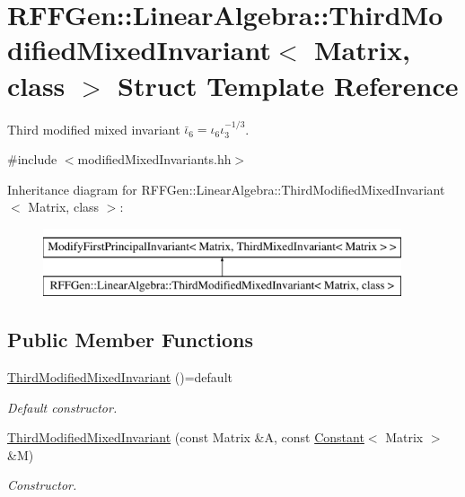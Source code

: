 \hypertarget{structRFFGen_1_1LinearAlgebra_1_1ThirdModifiedMixedInvariant}{\section{R\-F\-F\-Gen\-:\-:Linear\-Algebra\-:\-:Third\-Modified\-Mixed\-Invariant$<$ Matrix, class $>$ Struct Template Reference}
\label{structRFFGen_1_1LinearAlgebra_1_1ThirdModifiedMixedInvariant}
}


Third modified mixed invariant $\bar\iota_6=\iota_6\iota_3^{-1/3}$.  




{\ttfamily \#include $<$modified\-Mixed\-Invariants.\-hh$>$}

Inheritance diagram for R\-F\-F\-Gen\-:\-:Linear\-Algebra\-:\-:Third\-Modified\-Mixed\-Invariant$<$ Matrix, class $>$\-:\begin{figure}[H]
\begin{center}
\leavevmode
\includegraphics[height=2.000000cm]{structRFFGen_1_1LinearAlgebra_1_1ThirdModifiedMixedInvariant}
\end{center}
\end{figure}
\subsection*{Public Member Functions}
\begin{DoxyCompactItemize}
\item 
\hypertarget{structRFFGen_1_1LinearAlgebra_1_1ThirdModifiedMixedInvariant_a1739098d1de2ffbdaa0f148e9d1adba1}{\hyperlink{structRFFGen_1_1LinearAlgebra_1_1ThirdModifiedMixedInvariant_a1739098d1de2ffbdaa0f148e9d1adba1}{Third\-Modified\-Mixed\-Invariant} ()=default}\label{structRFFGen_1_1LinearAlgebra_1_1ThirdModifiedMixedInvariant_a1739098d1de2ffbdaa0f148e9d1adba1}

\begin{DoxyCompactList}\small\item\em Default constructor. \end{DoxyCompactList}\item 
\hyperlink{structRFFGen_1_1LinearAlgebra_1_1ThirdModifiedMixedInvariant_aea5e2e2d814d5bfe7f483ba6ea4bfd1d}{Third\-Modified\-Mixed\-Invariant} (const Matrix \&A, const \hyperlink{structRFFGen_1_1Constant}{Constant}$<$ Matrix $>$ \&M)
\begin{DoxyCompactList}\small\item\em Constructor. \end{DoxyCompactList}\end{DoxyCompactItemize}



